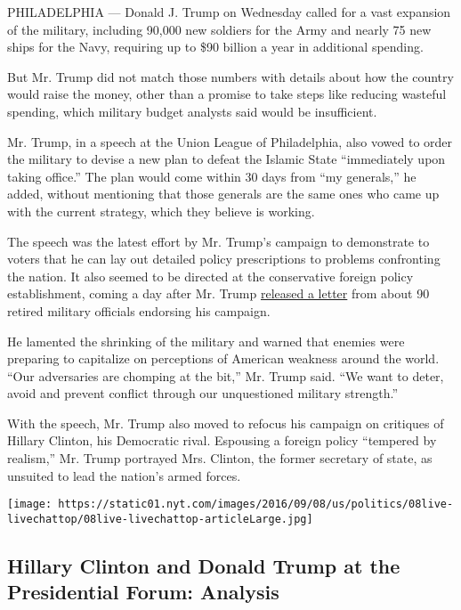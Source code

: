 PHILADELPHIA --- Donald J. Trump on Wednesday called for a vast
expansion of the military, including 90,000 new soldiers for the Army
and nearly 75 new ships for the Navy, requiring up to \$90 billion a
year in additional spending.

But Mr. Trump did not match those numbers with details about how the
country would raise the money, other than a promise to take steps like
reducing wasteful spending, which military budget analysts said would be
insufficient.

Mr. Trump, in a speech at the Union League of Philadelphia, also vowed
to order the military to devise a new plan to defeat the Islamic State
``immediately upon taking office.'' The plan would come within 30 days
from ``my generals,'' he added, without mentioning that those generals
are the same ones who came up with the current strategy, which they
believe is working.

The speech was the latest effort by Mr. Trump's campaign to demonstrate
to voters that he can lay out detailed policy prescriptions to problems
confronting the nation. It also seemed to be directed at the
conservative foreign policy establishment, coming a day after Mr. Trump
\href{http://www.nytimes.com/2016/09/07/us/politics/donald-trump-earns-backing-of-nearly-90-military-figures.html}{released
a letter} from about 90 retired military officials endorsing his
campaign.

He lamented the shrinking of the military and warned that enemies were
preparing to capitalize on perceptions of American weakness around the
world. ``Our adversaries are chomping at the bit,'' Mr. Trump said. ``We
want to deter, avoid and prevent conflict through our unquestioned
military strength.''

With the speech, Mr. Trump also moved to refocus his campaign on
critiques of Hillary Clinton, his Democratic rival. Espousing a foreign
policy ``tempered by realism,'' Mr. Trump portrayed Mrs. Clinton, the
former secretary of state, as unsuited to lead the nation's armed
forces.

\href{https://www.nytimes.com/interactive/2016/09/07/us/politics/trump-clinton-forum.html}{}

\texttt{[image: https://static01.nyt.com/images/2016/09/08/us/politics/08live-livechattop/08live-livechattop-articleLarge.jpg]}

\hypertarget{hillary-clinton-and-donald-trump-at-the-presidential-forum-analysis}{%
\subsection{Hillary Clinton and Donald Trump at the Presidential Forum:
Analysis}\label{hillary-clinton-and-donald-trump-at-the-presidential-forum-analysis}}


